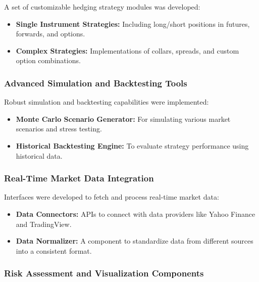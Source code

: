 \documentclass[12pt]{article}
\begin{document}
A set of customizable hedging strategy modules was developed:

\begin{itemize}
\item \textbf{Single Instrument Strategies:} Including long/short positions in futures, forwards, and options.

\item \textbf{Complex Strategies:} Implementations of collars, spreads, and custom option combinations.

\end{itemize}

\subsubsection{Advanced Simulation and Backtesting Tools}

Robust simulation and backtesting capabilities were implemented:

\begin{itemize}
\item \textbf{Monte Carlo Scenario Generator:} For simulating various market scenarios and stress testing.



\item \textbf{Historical Backtesting Engine:} To evaluate strategy performance using historical data.

\end{itemize}

\subsubsection{Real-Time Market Data Integration}

Interfaces were developed to fetch and process real-time market data:

\begin{itemize}
\item \textbf{Data Connectors:} APIs to connect with data providers like Yahoo Finance and TradingView.

\item \textbf{Data Normalizer:} A component to standardize data from different sources into a consistent format.

\end{itemize}

\subsubsection{Risk Assessment and Visualization Components}
\end{document}
